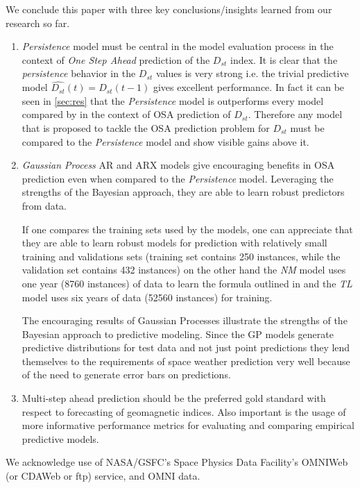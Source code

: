 \documentclass[referee,a4paper,12pt,traditabstract]{swsc}
\begin{document}
\begin{linenumbers}
We conclude this paper with three key conclusions/insights learned from our research so far.
   \begin{enumerate}
      \item \emph{Persistence} model must be central in the model evaluation process in the context of \emph{One Step Ahead} prediction of the $D_{st}$ index. It is clear that the \emph{persistence} behavior in the $D_{st}$ values is very strong i.e. the trivial predictive model $\hat{D_{st}}(t) = D_{st}(t-1)$ gives excellent performance. In fact it can be seen in \ref{sec:res} that the \emph{Persistence} model is outperforms every model compared by \citet{Ji2012} in the context of OSA prediction of $D_{st}$. Therefore any model that is proposed to tackle the OSA prediction problem for $D_{st}$ must be compared to the \emph{Persistence} model and show visible gains above it.
      
      \item \emph{Gaussian Process} AR and ARX models give encouraging benefits in OSA prediction even when compared to the \emph{Persistence} model. Leveraging the strengths of the Bayesian approach, they are able to learn robust predictors from data. 
      
      If one compares the training sets used by the models, one can appreciate that they are able to learn robust models for prediction with relatively small training and validations sets (training set contains 250 instances, while the validation set contains 432 instances) on the other hand the \emph{NM} model uses one year (8760 instances) of data to learn the formula outlined in \citet{balikhin:narmax} and the \emph{TL} model uses six years of data (52560 instances) for training. 
      
      The encouraging results of Gaussian Processes illustrate the strengths of the Bayesian approach to predictive modeling. Since the GP models generate predictive distributions for test data and not just point predictions they lend themselves to the requirements of space weather prediction very well because of the need to generate error bars on predictions.

      \item Multi-step ahead prediction should be the preferred gold standard with respect to forecasting of geomagnetic indices. Also important is the usage of more informative performance metrics for evaluating and comparing empirical predictive models.
   \end{enumerate}

\begin{acknowledgements}
      We acknowledge use of NASA/GSFC's Space Physics Data Facility's OMNIWeb (or CDAWeb or ftp) service, and OMNI data.
\end{acknowledgements}




\end{linenumbers}
\end{document}
